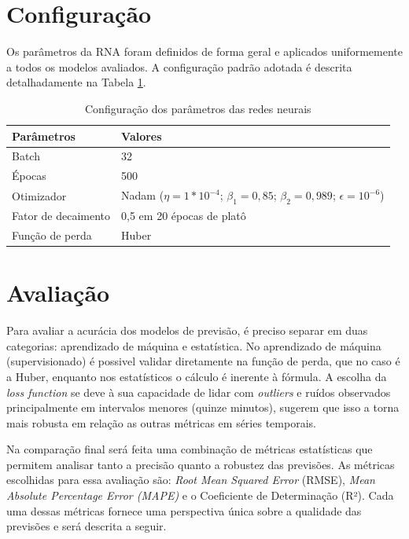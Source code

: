 \section{Configuração} \label{sec:configuracao} 
Os parâmetros da RNA foram definidos de forma geral e aplicados uniformemente a todos os modelos avaliados. A configuração padrão adotada é descrita detalhadamente na Tabela \ref{tabela:parametros}.

\begin{table}[h!]
    \caption{Configuração dos parâmetros das redes neurais} \label{tabela:parametros}
    \begin{tabularx}{\textwidth}{X|X} \hline
    Parâmetros & Valores \\ \hline
    Batch         & 32               \\ \hline
    Épocas         & 500              \\ \hline
    Otimizador               & Nadam ($\eta=1*10^{-4}$; $\beta_1=0{,}85$; $\beta_2=0{,}989$; $\epsilon=10^{-6}$)             \\ \hline
    Fator de decaimento          & 0,5 em 20 épocas de platô            \\ \hline
    Função de perda          & Huber              \\ \hline
    \end{tabularx}
\end{table}

\section{Avaliação} \label{sec:avaliacao}
Para avaliar a acurácia dos modelos de previsão, é preciso separar em duas categorias: aprendizado de máquina e estatística.
No aprendizado de máquina (supervisionado) é possivel validar diretamente na função de perda, que no caso é a Huber, enquanto nos estatísticos o cálculo é inerente à fórmula.
A escolha da \textit{loss function} se deve à sua capacidade de lidar com \textit{outliers} e ruídos observados principalmente em intervalos menores (quinze minutos), \textcite{Jaiswal} sugerem que isso a torna mais robusta em relação as outras métricas em séries temporais.

Na comparação final será feita uma combinação de métricas estatísticas 
que permitem analisar tanto a precisão quanto a robustez das previsões.
As métricas escolhidas para essa avaliação são: 
\textit{Root Mean Squared Error} (RMSE), \textit{Mean Absolute Percentage Error (MAPE)} e o Coeficiente de Determinação (R²). Cada uma dessas métricas fornece uma perspectiva única sobre a qualidade das previsões e será descrita a seguir.

